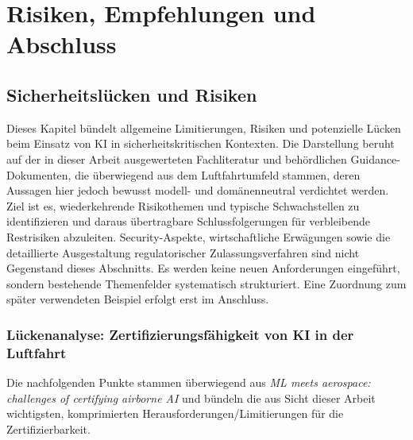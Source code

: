 \part{Risiken, Empfehlungen und Abschluss}
\chapter{Sicherheitslücken und Risiken}\label{chap:risiken}

Dieses Kapitel bündelt allgemeine Limitierungen, Risiken und potenzielle Lücken beim 
Einsatz von KI in sicherheitskritischen Kontexten. Die Darstellung beruht auf der in dieser 
Arbeit ausgewerteten Fachliteratur und behördlichen Guidance-Dokumenten, die überwiegend aus 
dem Luftfahrtumfeld stammen, deren Aussagen hier jedoch bewusst modell- und domänenneutral 
verdichtet werden. Ziel ist es, wiederkehrende Risikothemen und typische Schwachstellen zu 
identifizieren und daraus übertragbare Schlussfolgerungen für verbleibende Restrisiken abzuleiten. 
Security-Aspekte, wirtschaftliche Erwägungen sowie die detaillierte Ausgestaltung regulatorischer 
Zulassungsverfahren sind nicht Gegenstand dieses Abschnitts. Es werden keine neuen Anforderungen 
eingeführt, sondern bestehende Themenfelder systematisch strukturiert. Eine Zuordnung zum später 
verwendeten Beispiel erfolgt erst im Anschluss.


\section{Lückenanalyse: Zertifizierungsfähigkeit von KI in der Luftfahrt}
Die nachfolgenden Punkte stammen überwiegend aus \emph{ML meets aerospace: challenges of certifying airborne AI} \parencite{ml-meets-aerospace-2024} und bündeln die aus Sicht dieser Arbeit wichtigsten, komprimierten Herausforderungen/Limitierungen für die Zertifizierbarkeit.

